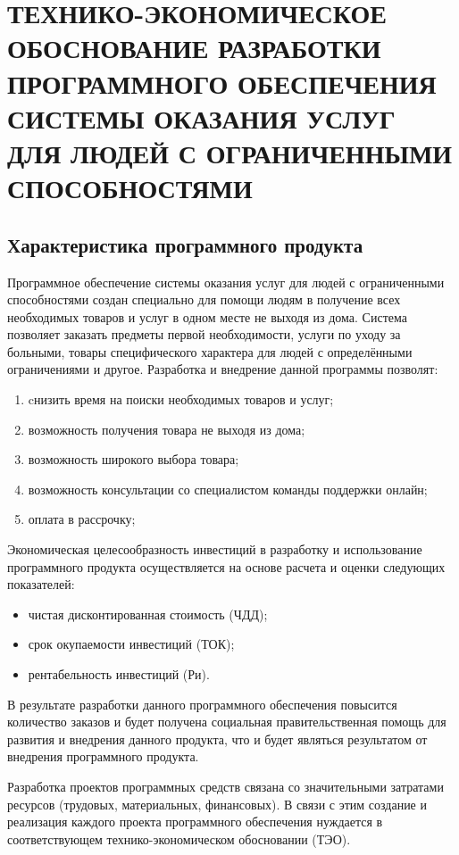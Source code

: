 \section{ТЕХНИКО-ЭКОНОМИЧЕСКОЕ ОБОСНОВАНИЕ РАЗРАБОТКИ ПРОГРАММНОГО ОБЕСПЕЧЕНИЯ СИСТЕМЫ ОКАЗАНИЯ УСЛУГ ДЛЯ ЛЮДЕЙ С ОГРАНИЧЕННЫМИ СПОСОБНОСТЯМИ}

\subsection{Характеристика программного продукта}
Программное обеспечение системы оказания услуг для людей с ограниченными способностями создан специально для помощи людям в получение всех необходимых товаров и услуг в одном месте не выходя из дома. Система позволяет заказать предметы первой необходимости, услуги по уходу за больными, товары специфического характера для людей с определёнными ограничениями и другое.
Разработка и внедрение данной программы позволят: 

\begin{enumerate}
    \item cнизить время на поиски необходимых товаров и услуг;
    \item возможность получения товара не выходя из дома;
    \item возможность широкого выбора товара;
    \item возможность консультации со специалистом команды поддержки онлайн;
    \item оплата в рассрочку;
\end{enumerate}

Экономическая целесообразность инвестиций в разработку и использование программного продукта осуществляется на основе расчета и оценки следующих показателей:
\begin{itemize}
    \item чистая  дисконтированная стоимость (ЧДД);
    \item срок окупаемости инвестиций (ТОК);
    \item рентабельность инвестиций (Ри).
\end{itemize}

В результате разработки данного программного обеспечения повысится количество заказов и будет получена социальная правительственная помощь для развития и внедрения данного продукта, что и будет являться результатом от внедрения программного продукта.

Разработка проектов программных средств связана со значительными затратами ресурсов (трудовых, материальных, финансовых). В связи с этим создание и реализация каждого проекта программного обеспечения нуждается в соответствующем технико-экономическом обосновании (ТЭО).

